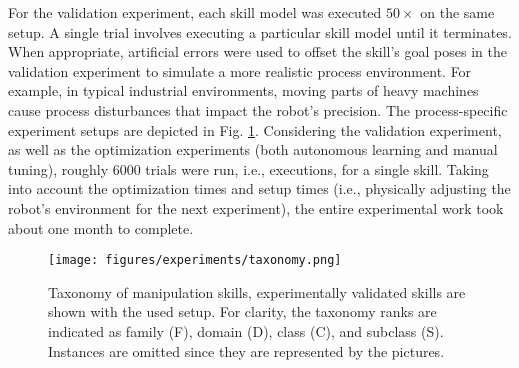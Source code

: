 For the validation experiment, each skill model was executed $50 \times$ on the same setup.
A single trial involves executing a particular skill model until it terminates.
When appropriate, artificial errors were used to offset the skill's goal poses in the validation experiment to simulate a more realistic process environment.
For example, in typical industrial environments, moving parts of heavy machines cause process disturbances that impact the robot's precision.
The process-specific experiment setups are depicted in Fig. \ref{fig:experiments:taxonomy:taxonomy}.
Considering the validation experiment, as well as the optimization experiments (both autonomous learning and manual tuning), roughly $6000$ trials were run, i.e., executions, for a single skill.
Taking into account the optimization times and setup times (i.e., physically adjusting the robot's environment for the next experiment), the entire experimental work took about one month to complete.

\begin{figure}[ht!]
    \centering
    \texttt{[image: figures/experiments/taxonomy.png]}
    \caption{Taxonomy of manipulation skills, experimentally validated skills are shown with the used setup. For clarity, the taxonomy ranks are indicated as family (F), domain (D), class (C), and subclass (S). Instances are omitted since they are represented by the pictures.}
    \label{fig:experiments:taxonomy:taxonomy}
\end{figure}

